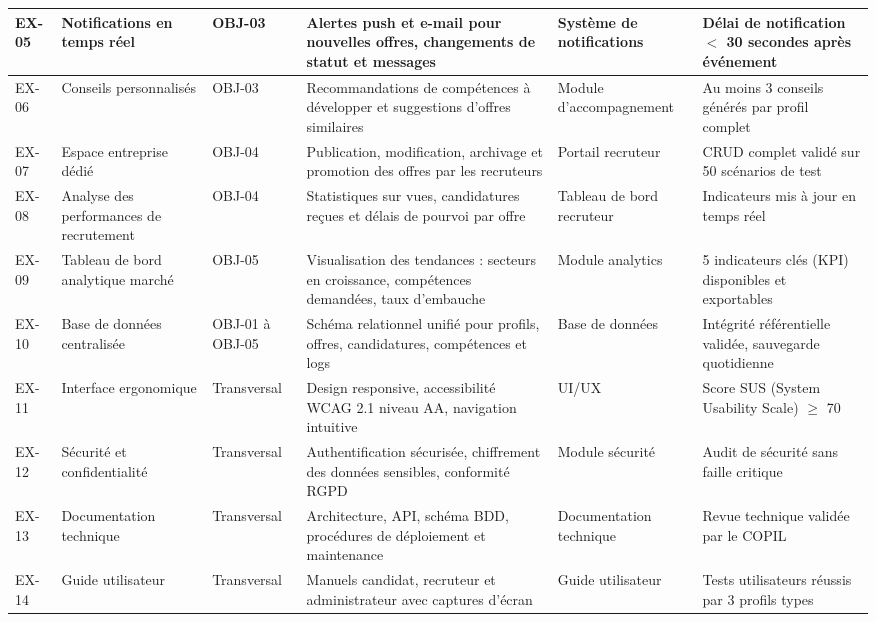 \documentclass[11pt,a4paper]{article}
\begin{document}
\begin{longtable}{|p{0.7cm}|p{2.8cm}|p{2.2cm}|p{2.8cm}|p{2.5cm}|p{2cm}|}
    EX-05 &
    Notifications en temps réel &
    OBJ-03 &
    Alertes push et e-mail pour nouvelles offres, changements de statut et messages &
    Système de notifications &
    Délai de notification $<$ 30 secondes après événement \\
    \hline

    EX-06 &
    Conseils personnalisés &
    OBJ-03 &
    Recommandations de compétences à développer et suggestions d'offres similaires &
    Module d'accompagnement &
    Au moins 3 conseils générés par profil complet \\
    \hline

    EX-07 &
    Espace entreprise dédié &
    OBJ-04 &
    Publication, modification, archivage et promotion des offres par les recruteurs &
    Portail recruteur &
    CRUD complet validé sur 50 scénarios de test \\
    \hline

    EX-08 &
    Analyse des performances de recrutement &
    OBJ-04 &
    Statistiques sur vues, candidatures reçues et délais de pourvoi par offre &
    Tableau de bord recruteur &
    Indicateurs mis à jour en temps réel \\
    \hline

    EX-09 &
    Tableau de bord analytique marché &
    OBJ-05 &
    Visualisation des tendances : secteurs en croissance, compétences demandées, taux d'embauche &
    Module analytics &
    5 indicateurs clés (KPI) disponibles et exportables \\
    \hline

    EX-10 &
    Base de données centralisée &
    OBJ-01 à OBJ-05 &
    Schéma relationnel unifié pour profils, offres, candidatures, compétences et logs &
    Base de données &
    Intégrité référentielle validée, sauvegarde quotidienne \\
    \hline

    EX-11 &
    Interface ergonomique &
    Transversal &
    Design responsive, accessibilité WCAG 2.1 niveau AA, navigation intuitive &
    UI/UX &
    Score SUS (System Usability Scale) $\geq$ 70 \\
    \hline

    EX-12 &
    Sécurité et confidentialité &
    Transversal &
    Authentification sécurisée, chiffrement des données sensibles, conformité RGPD &
    Module sécurité &
    Audit de sécurité sans faille critique \\
    \hline

    EX-13 &
    Documentation technique &
    Transversal &
    Architecture, API, schéma BDD, procédures de déploiement et maintenance &
    Documentation technique &
    Revue technique validée par le COPIL \\
    \hline

    EX-14 &
    Guide utilisateur &
    Transversal &
    Manuels candidat, recruteur et administrateur avec captures d'écran &
    Guide utilisateur &
    Tests utilisateurs réussis par 3 profils types \\
    \hline
\end{longtable}
\normalsize
\end{document}
